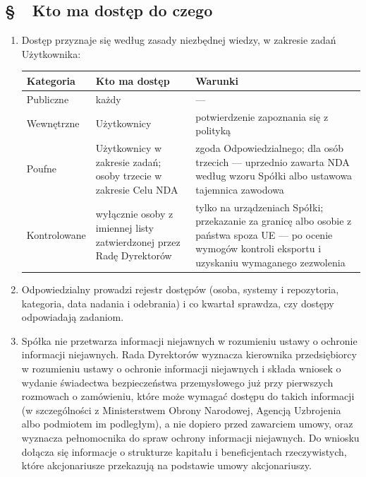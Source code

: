 \documentclass[11pt,a4paper]{report}
\newcounter{paragraf}
\newcommand{\paragraf}[1]{%
  \refstepcounter{paragraf}%
  \Needspace{5\baselineskip}%
  \subsection*{\S~\theparagraf\ #1}%
}
\newenvironment{ContractClause}[1]{\paragraf{#1}}{\par}
\begin{document}
\begin{ContractClause}{Kto ma dostęp do czego}
\begin{enumerate}
  \item Dostęp przyznaje się według zasady niezbędnej wiedzy, w zakresie zadań Użytkownika:

\begin{center}
\begin{tabularx}{\linewidth}{@{}>{\raggedright\arraybackslash}p{2.6cm} >{\raggedright\arraybackslash}X >{\raggedright\arraybackslash}X@{}}
\toprule
\textbf{Kategoria} & \textbf{Kto ma dostęp} & \textbf{Warunki} \\
\midrule
Publiczne & każdy & --- \\
Wewnętrzne & Użytkownicy & potwierdzenie zapoznania się z polityką \\
Poufne & Użytkownicy w zakresie zadań; osoby trzecie w zakresie Celu NDA & zgoda Odpowiedzialnego; dla osób trzecich --- uprzednio zawarta NDA według wzoru Spółki albo ustawowa tajemnica zawodowa \\
Kontrolowane & wyłącznie osoby z imiennej listy zatwierdzonej przez Radę Dyrektorów & tylko na urządzeniach Spółki; przekazanie za granicę albo osobie z państwa spoza UE --- po ocenie wymogów kontroli eksportu i uzyskaniu wymaganego zezwolenia \\
\bottomrule
\end{tabularx}
\end{center}

  \item Odpowiedzialny prowadzi rejestr dostępów (osoba, systemy i repozytoria, kategoria, data nadania i odebrania) i co kwartał sprawdza, czy dostępy odpowiadają zadaniom.
  \item Spółka nie przetwarza informacji niejawnych w rozumieniu ustawy o ochronie informacji niejawnych. Rada Dyrektorów wyznacza kierownika przedsiębiorcy w rozumieniu ustawy o ochronie informacji niejawnych i składa wniosek o wydanie świadectwa bezpieczeństwa przemysłowego już przy pierwszych rozmowach o zamówieniu, które może wymagać dostępu do takich informacji (w szczególności z Ministerstwem Obrony Narodowej, Agencją Uzbrojenia albo podmiotem im podległym), a nie dopiero przed zawarciem umowy, oraz wyznacza pełnomocnika do spraw ochrony informacji niejawnych. Do wniosku dołącza się informacje o strukturze kapitału i beneficjentach rzeczywistych, które akcjonariusze przekazują na podstawie umowy akcjonariuszy.
\end{enumerate}
\end{ContractClause}
\end{document}
